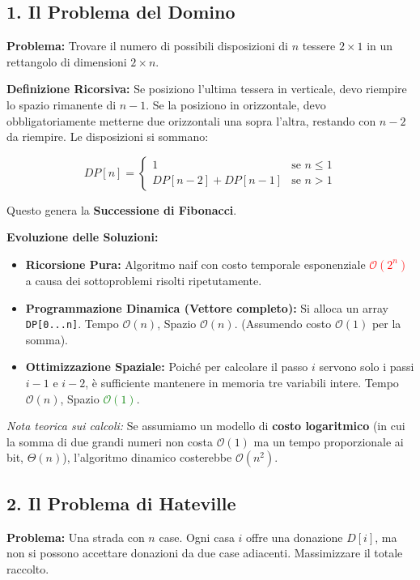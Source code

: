 \documentclass[12pt, a4paper]{article}
\begin{document}
\subsection{1. Il Problema del Domino}
\textbf{Problema:} Trovare il numero di possibili disposizioni di $n$ tessere $2 \times 1$ in un rettangolo di dimensioni $2 \times n$.

\textbf{Definizione Ricorsiva:}
Se posiziono l'ultima tessera in verticale, devo riempire lo spazio rimanente di $n-1$. Se la posiziono in orizzontale, devo obbligatoriamente metterne due orizzontali una sopra l'altra, restando con $n-2$ da riempire. Le disposizioni si sommano:


$$DP[n] = \begin{cases} 1 & \text{se } n \le 1 \\ DP[n-2] + DP[n-1] & \text{se } n > 1 \end{cases}$$


Questo genera la \textbf{Successione di Fibonacci}.

\textbf{Evoluzione delle Soluzioni:}
\begin{itemize}
\item \textbf{Ricorsione Pura:} Algoritmo naif con costo temporale esponenziale \textcolor{red}{$\mathcal{O}(2^n)$} a causa dei sottoproblemi risolti ripetutamente.
\item \textbf{Programmazione Dinamica (Vettore completo):} Si alloca un array \texttt{DP[0...n]}. Tempo $\mathcal{O}(n)$, Spazio $\mathcal{O}(n)$. (Assumendo costo $\mathcal{O}(1)$ per la somma).
\item \textbf{Ottimizzazione Spaziale:} Poiché per calcolare il passo $i$ servono solo i passi $i-1$ e $i-2$, è sufficiente mantenere in memoria tre variabili intere. Tempo $\mathcal{O}(n)$, Spazio \textcolor{green}{$\mathcal{O}(1)$}.
\end{itemize}
\textit{Nota teorica sui calcoli:} Se assumiamo un modello di \textbf{costo logaritmico} (in cui la somma di due grandi numeri non costa $\mathcal{O}(1)$ ma un tempo proporzionale ai bit, $\Theta(n)$), l'algoritmo dinamico costerebbe $\mathcal{O}(n^2)$.

\subsection{2. Il Problema di Hateville}
\textbf{Problema:} Una strada con $n$ case. Ogni casa $i$ offre una donazione $D[i]$, ma non si possono accettare donazioni da due case adiacenti. Massimizzare il totale raccolto.
\end{document}
